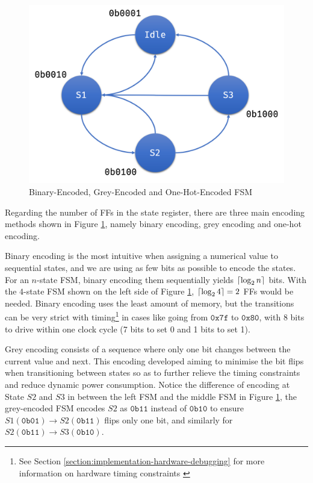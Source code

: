 \documentclass[a4paper]{report}
\DeclarePairedDelimiter\ceil{\lceil}{\rceil}
\begin{document}
\begin{figure}[h!]
\begin{minipage}{0.35\textwidth}
        \includegraphics[width=\linewidth]{imgs/one-hot-fsm.png}
    \end{minipage}
    \caption{Binary-Encoded, Grey-Encoded and One-Hot-Encoded FSM}
    \label{fig:binary-grey-one-hot-encoded-FSM}
\end{figure}

Regarding the number of FFs in the state register, there are three main encoding methods shown in Figure \ref{fig:binary-grey-one-hot-encoded-FSM}, namely binary encoding, grey encoding and one-hot encoding.

Binary encoding is the most intuitive when assigning a numerical value to sequential states, and we are using as few bits as possible to encode the states. For an $n$-state FSM, binary encoding them sequentially yields $\ceil*{\log_2 n}$ bits. With the $4$-state FSM shown on the left side of Figure \ref{fig:binary-grey-one-hot-encoded-FSM}, $\ceil*{\log_2 4} = 2$ FFs would be needed. Binary encoding uses the least amount of memory, but the transitions can be very strict with timing\footnote{See Section \ref{section:implementation-hardware-debugging} for more information on hardware timing constraints \label{foot:timing-constraints}} in cases like going from $\mathtt{0x7f}$ to $\mathtt{0x80}$, with 8 bits to drive within one clock cycle (7 bits to set 0 and 1 bits to set 1).

Grey encoding consists of a sequence where only one bit changes between the current value and next. This encoding developed aiming to minimise the bit flips when transitioning between states so as to further relieve the timing constraints and reduce dynamic power consumption. Notice the difference of encoding at State $S2$ and $S3$ in between the left FSM and the middle FSM in Figure \ref{fig:binary-grey-one-hot-encoded-FSM}, the grey-encoded FSM encodes $S2$ as $\mathtt{0b11}$ instead of $\mathtt{0b10}$ to ensure $S1 (\mathtt{0b01})\xrightarrow{}S2(\mathtt{0b11})$ flips only one bit, and similarly for $S2 (\mathtt{0b11})\xrightarrow{}S3(\mathtt{0b10})$.
\end{document}
